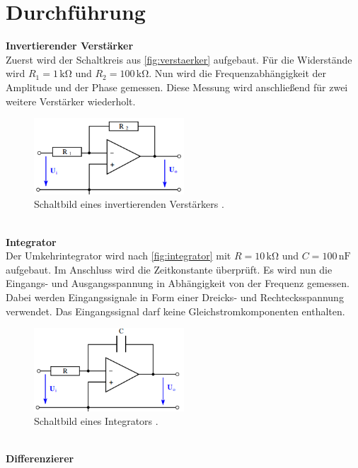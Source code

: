 \section{Durchführung}
\label{sec:Durchführung}

\textbf{Invertierender Verstärker}\\
Zuerst wird der Schaltkreis aus \autoref{fig:verstaerker} aufgebaut. Für die Widerstände wird
$R_1 = 1 \,\unit{\kilo\ohm}$ und $R_2 = 100 \,\unit{\kilo\ohm}$. Nun wird die Frequenzabhängigkeit der
Amplitude und der Phase gemessen. Diese Messung wird anschließend für zwei weitere Verstärker wiederholt. \\
\begin{figure}
    \centering
    \includegraphics[width=0.5\textwidth]{invertierend.png}
    \caption{Schaltbild eines invertierenden Verstärkers \cite{ap51}.}
    \label{fig:verstaerker}
\end{figure}
\\
\textbf{Integrator}\\
Der Umkehrintegrator wird nach \autoref{fig:integrator} mit $R = 10\,\unit{\kilo\ohm}$ und 
$C = 100\,\text{nF}$ aufgebaut. Im Anschluss wird die Zeitkonstante überprüft. 
Es wird nun die Eingangs- und Ausgangsspannung in Abhängigkeit von der Frequenz gemessen. 
Dabei werden Eingangssignale in Form einer Dreicks- und Rechtecksspannung verwendet. Das Eingangssignal 
darf keine Gleichstromkomponenten enthalten.\\
\begin{figure}
    \centering
    \includegraphics[width=0.5\textwidth]{integrator.png}
    \caption{Schaltbild eines Integrators \cite{ap51}.}
    \label{fig:integrator}
\end{figure}
\\
\textbf{Differenzierer}\\
